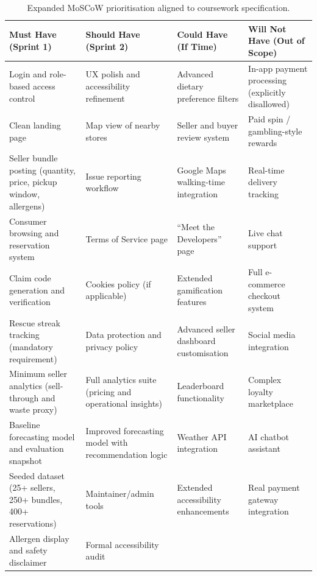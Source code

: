 \documentclass[12pt]{article}
\begin{document}
\begin{table}[H]
\centering
\begin{tabular}{|p{3.4cm}|p{3.4cm}|p{3.4cm}|p{3.4cm}|}
\hline
\textbf{Must Have (Sprint 1)} &
\textbf{Should Have (Sprint 2)} &
\textbf{Could Have (If Time)} &
\textbf{Will Not Have (Out of Scope)} \\
\hline

Login and role-based access control &
UX polish and accessibility refinement &
Advanced dietary preference filters &
In-app payment processing (explicitly disallowed) \\
\hline

Clean landing page &
Map view of nearby stores &
Seller and buyer review system &
Paid spin / gambling-style rewards \\
\hline

Seller bundle posting (quantity, price, pickup window, allergens) &
Issue reporting workflow &
Google Maps walking-time integration &
Real-time delivery tracking \\
\hline

Consumer browsing and reservation system &
Terms of Service page &
“Meet the Developers” page &
Live chat support \\
\hline

Claim code generation and verification &
Cookies policy (if applicable) &
Extended gamification features &
Full e-commerce checkout system \\
\hline

Rescue streak tracking (mandatory requirement) &
Data protection and privacy policy &
Advanced seller dashboard customisation &
Social media integration \\
\hline

Minimum seller analytics (sell-through and waste proxy) &
Full analytics suite (pricing and operational insights) &
Leaderboard functionality &
Complex loyalty marketplace \\
\hline

Baseline forecasting model and evaluation snapshot &
Improved forecasting model with recommendation logic &
Weather API integration &
AI chatbot assistant \\
\hline

Seeded dataset (25+ sellers, 250+ bundles, 400+ reservations) &
Maintainer/admin tools &
Extended accessibility enhancements &
Real payment gateway integration \\
\hline

Allergen display and safety disclaimer &
Formal accessibility audit &
 &
 \\
\hline
\end{tabular}
\caption{Expanded MoSCoW prioritisation aligned to coursework specification.}
\end{table}
\end{document}
